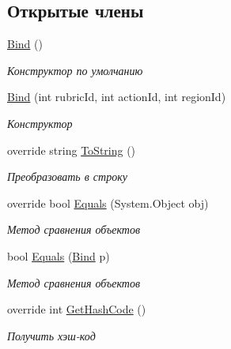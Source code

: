 \subsection*{Открытые члены}
\begin{DoxyCompactItemize}
\item 
\hyperlink{class_r_t_1_1_parsing_libs_1_1_models_1_1_bind_a1f267ab735462ac9086c6f1eec2ebffe}{Bind} ()
\begin{DoxyCompactList}\small\item\em Конструктор по умолчанию \end{DoxyCompactList}\item 
\hyperlink{class_r_t_1_1_parsing_libs_1_1_models_1_1_bind_a982063bf083039d7f1d9704dcd5c86ac}{Bind} (int rubric\+Id, int action\+Id, int region\+Id)
\begin{DoxyCompactList}\small\item\em Конструктор \end{DoxyCompactList}\item 
override string \hyperlink{class_r_t_1_1_parsing_libs_1_1_models_1_1_bind_a822587e1235b85eb9f17ba6b3d634005}{To\+String} ()
\begin{DoxyCompactList}\small\item\em Преобразовать в строку \end{DoxyCompactList}\item 
override bool \hyperlink{class_r_t_1_1_parsing_libs_1_1_models_1_1_bind_a357f6c7991435884fe72b307d893eecf}{Equals} (System.\+Object obj)
\begin{DoxyCompactList}\small\item\em Метод сравнения объектов \end{DoxyCompactList}\item 
bool \hyperlink{class_r_t_1_1_parsing_libs_1_1_models_1_1_bind_aeb1639c9c5370114af8d5413c5f7be33}{Equals} (\hyperlink{class_r_t_1_1_parsing_libs_1_1_models_1_1_bind}{Bind} p)
\begin{DoxyCompactList}\small\item\em Метод сравнения объектов \end{DoxyCompactList}\item 
override int \hyperlink{class_r_t_1_1_parsing_libs_1_1_models_1_1_bind_afcb8edc39a0c01e15aaf51c565d89a00}{Get\+Hash\+Code} ()
\begin{DoxyCompactList}\small\item\em Получить хэш-\/код \end{DoxyCompactList}\end{DoxyCompactItemize}
